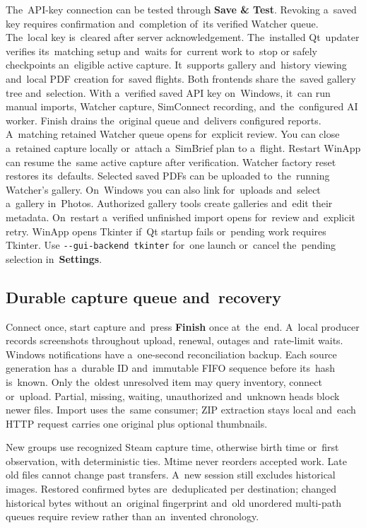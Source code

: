\documentclass[11pt,a4paper]{article}
\newcommand{\ui}[1]{\textbf{#1}}
\newcommand{\codeword}[1]{\nolinkurl{#1}}
\begin{document}
The~API-key connection can be tested through \ui{Save \& Test}.
Revoking a~saved key requires confirmation and~completion of~its verified
Watcher queue. The~local key is~cleared after server acknowledgement.
The~installed Qt~updater verifies its~matching setup and~waits for~current
work to~stop or safely checkpoints an~eligible active capture.
It~supports gallery and~history viewing and~local PDF creation for~saved flights.
Both frontends share the~saved gallery tree and~selection.
With a~verified saved API key on~Windows,
it~can run manual imports, Watcher capture, SimConnect recording,
and~the~configured AI worker. Finish drains the~original queue and~delivers
configured reports. A~matching retained Watcher queue opens for~explicit review.
You can close a~retained capture locally or~attach a~SimBrief plan to a~flight.
Restart WinApp can resume the~same active capture after verification.
Watcher factory reset restores its~defaults. Selected saved PDFs can be
uploaded to~the~running Watcher's gallery.
On~Windows you can also link for~uploads and~select a~gallery in~Photos.
Authorized gallery tools create galleries and~edit their metadata.
On~restart a~verified
unfinished import opens for~review and~explicit retry. WinApp opens Tkinter
if~Qt startup fails or~pending work requires Tkinter. Use \codeword{--gui-backend tkinter} for~one launch
or~cancel the~pending selection in~\ui{Settings}.

\subsection{Durable capture queue and~recovery}

Connect once, start capture and~press \ui{Finish} once at~the~end.
A~local producer records screenshots throughout upload, renewal, outages
and~rate-limit waits. Windows notifications have a~one-second reconciliation
backup. Each source generation has a~durable ID and~immutable FIFO sequence
before its~hash is~known. Only the~oldest unresolved item may query inventory,
connect or~upload. Partial, missing, waiting, unauthorized and~unknown heads
block newer files. Import uses the~same consumer; ZIP extraction stays local
and~each HTTP request carries one original plus optional thumbnails.

New groups use recognized Steam capture time, otherwise birth time or~first
observation, with deterministic ties. Mtime never reorders accepted work.
Late old files cannot change past transfers. A~new session still excludes
historical images. Restored confirmed bytes are~deduplicated per destination;
changed historical bytes without an~original fingerprint and~old unordered
multi-path queues require review rather than an~invented chronology.
\end{document}
